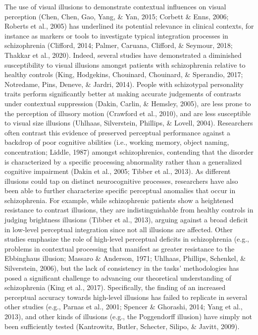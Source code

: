 \documentclass[
  english,
  man,floatsintext]{apa6}
\begin{document}
The use of visual illusions to demonstrate contextual influences on visual perception (Chen, Chen, Gao, Yang, \& Yan, 2015; Corbett \& Enns, 2006; Roberts et al., 2005) has underlined its potential relevance in clinical contexts, for instance as markers or tools to investigate typical integration processes in schizophrenia (Clifford, 2014; Palmer, Caruana, Clifford, \& Seymour, 2018; Thakkar et al., 2020). Indeed, several studies have demonstrated a diminished susceptibility to visual illusions amongst patients with schizophrenia relative to healthy controls (King, Hodgekins, Chouinard, Chouinard, \& Sperandio, 2017; Notredame, Pins, Deneve, \& Jardri, 2014). People with schizotypal personality traits perform significantly better at making accurate judgements of contrasts under contextual suppression (Dakin, Carlin, \& Hemsley, 2005), are less prone to the perception of illusory motion (Crawford et al., 2010), and are less susceptible to visual size illusions (Uhlhaas, Silverstein, Phillips, \& Lovell, 2004). Researchers often contrast this evidence of preserved perceptual performance against a backdrop of poor cognitive abilities (i.e., working memory, object naming, concentration; Liddle, 1987) amongst schizophrenics, contending that the disorder is characterized by a specific processing abnormality rather than a generalized cognitive impairment (Dakin et al., 2005; Tibber et al., 2013). As different illusions could tap on distinct neurocognitive processes, researchers have also been able to further characterize specific perceptual anomalies that occur in schizophrenia. For example, while schizophrenic patients show a heightened resistance to contrast illusions, they are indistinguishable from healthy controls in judging brightness illusions (Tibber et al., 2013), arguing against a broad deficit in low-level perceptual integration since not all illusions are affected. Other studies emphasize the role of high-level perceptual deficits in schizophrenia (e.g., problems in contextual processing that manifest as greater resistance to the Ebbinghaus illusion; Massaro \& Anderson, 1971; Uhlhaas, Phillips, Schenkel, \& Silverstein, 2006), but the lack of consistency in the tasks' methodologies has posed a significant challenge to advancing our theoretical understanding of schizophrenia (King et al., 2017). Specifically, the finding of an increased perceptual accuracy towards high-level illusions has failed to replicate in several other studies (e.g., Parnas et al., 2001; Spencer \& Ghorashi, 2014; Yang et al., 2013), and other kinds of illusions (e.g., the Poggendorff illusion) have simply not been sufficiently tested (Kantrowitz, Butler, Schecter, Silipo, \& Javitt, 2009).
\end{document}

